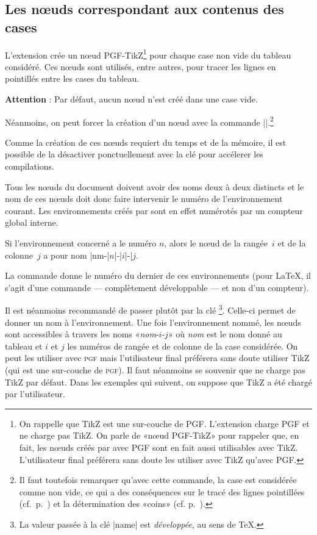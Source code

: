 \documentclass[dvipsnames]{article}%
\begin{document}
\subsection{Les nœuds correspondant aux contenus des cases}


L'extension  crée un nœud PGF-TikZ\footnote{On rappelle que TikZ
  est une sur-couche de PGF. L'extension  charge PGF et ne
  charge pas TikZ. On parle de «nœud PGF-TikZ» pour rappeler que, en fait, les
  nœuds créés par  avec PGF sont en fait aussi utilisables avec
  TikZ. L'utilisateur final préférera sans doute les utiliser avec TikZ qu'avec
  PGF.} pour chaque case non vide du tableau considéré. Ces nœuds sont utilisés,
entre autres, pour tracer les lignes en pointillés entre les cases du tableau.

\smallskip
\textbf{Attention} : Par défaut, aucun nœud n'est créé dans une case vide.

\smallskip
Néanmoins, on peut forcer la création d'un nœud avec la commande |\NotEmpty|.\footnote{Il faut toutefois remarquer qu'avec cette commande, la
  case est considérée comme non vide, ce qui a des conséquences sur le tracé des
lignes pointillées (cf.~p.~\pageref{Cdots}) et la détermination des «coins»
(cf. p.~\pageref{corners}).}

\medskip
Comme la création de ces nœuds requiert du temps et de la mémoire, il est
possible de la désactiver ponctuellement avec la clé 
pour accélerer les compilations. 

\medskip
Tous les nœuds du document doivent avoir des noms deux à deux distincts et le
nom de ces nœuds doit donc faire intervenir le numéro de l'environnement
courant. Les environnements créés par  sont en effet numérotés
par un compteur global interne.

\smallskip
Si l'environnement concerné a le numéro $n$, alors le nœud de la rangée~$i$ et
de la colonne~$j$ a pour nom |nm-|$n$|-|$i$|-|$j$.

\smallskip
{}
La commande  donne le numéro du dernier de
ces environnements (pour LaTeX, il s'agit d'une commande — complètement
développable — et non d'un compteur).

\smallskip
{}
Il est néanmoins recommandé de passer plutôt par la clé \footnote{La
  valeur passée à la clé |name| est \emph{développée}, au sens de TeX.}.
Celle-ci permet de donner un nom à l'environnement. Une fois l'environnement
nommé, les nœuds sont accessibles à travers les noms «\textsl{nom}-$i$-$j$» où
\textsl{nom} est le nom donné au tableau et $i$ et $j$ les numéros de rangée et
de colonne de la case considérée. On peut les utiliser avec \textsc{pgf} mais
l'utilisateur final préférera sans doute utiliser TikZ (qui est une sur-couche
de \textsc{pgf}). Il faut néanmoins se souvenir que  ne charge
pas TikZ par défaut. Dans les exemples qui suivent, on suppose que TikZ a été
chargé par l'utilisateur.
\end{document}
